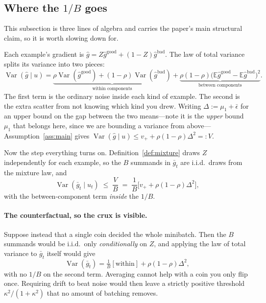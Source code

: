 \documentclass{article}
\theoremstyle{plain}
\theoremstyle{definition}
\theoremstyle{remark}
\newcommand{\E}{\mathbb{E}}
\newcommand{\Var}{\operatorname{Var}}
\newcommand{\1}{\mathbf{1}}
\newcommand{\good}{\mathrm{good}}
\newcommand{\bad}{\mathrm{bad}}
\begin{document}
\subsection{Where the \texorpdfstring{$1/B$}{1/B} goes}
\label{sec:variance}

This subsection is three lines of algebra and carries the paper's main structural
claim, so it is worth slowing down for.

Each example's gradient is $\hat g = Z\hat g^{\good} + (1-Z)\hat g^{\bad}$. The
law of total variance splits its variance into two pieces:
\begin{equation}
\label{eq:totalvar}
\Var(\hat g\mid u)
= \underbrace{\rho\Var(\hat g^{\good}) + (1-\rho)\Var(\hat g^{\bad})}_{\text{within components}}
+ \underbrace{\rho(1-\rho)\big(\E\hat g^{\good}-\E\hat g^{\bad}\big)^2}_{\text{between components}} .
\end{equation}
The first term is the ordinary noise inside each kind of example. The second is
the extra scatter from not knowing which kind you drew. Writing
$\Delta := \mu_1 + \bar\epsilon$ for an upper bound on the gap between the two
means---note it is the \emph{upper} bound $\mu_1$ that belongs here, since we are
bounding a variance from above---Assumption~\ref{ass:main} gives
$\Var(\hat g\mid u)\le v_+ + \rho(1-\rho)\Delta^2 =: V$.

Now the step everything turns on. Definition~\ref{def:mixture} draws $Z$
independently for each example, so the $B$ summands in $\bar g_t$ are i.i.d.\
draws from the mixture law, and
\begin{equation}
\label{eq:batchvar}
\Var(\bar g_t\mid u_t) \;\le\; \frac{V}{B}
\;=\;\frac1B\Big[v_+ + \rho(1-\rho)\Delta^2\Big],
\end{equation}
with the between-component term \emph{inside} the $1/B$.

\paragraph{The counterfactual, so the crux is visible.}
Suppose instead that a single coin decided the whole minibatch. Then the $B$
summands would be i.i.d.\ only \emph{conditionally} on $Z$, and applying the law
of total variance to $\bar g_t$ itself would give
\[
\Var(\bar g_t) = \tfrac1B[\text{within}] + \rho(1-\rho)\Delta^2,
\]
with no $1/B$ on the second term. Averaging cannot help with a coin you only flip
once. Requiring drift to beat noise would then leave a strictly positive
threshold $\kappa^2/(1+\kappa^2)$ that no amount of batching removes.
\end{document}
